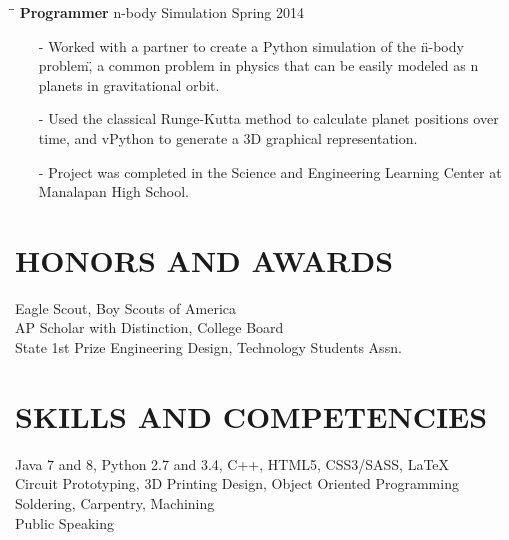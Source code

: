 \documentclass{res}
\begin{document}
\begin{resume}
\begin{tabbing}
    \hspace{2.3in}\= \hspace{2.4in}\= \kill
    {\bf Programmer} \>n-body Simulation \>Spring 2014\\
  \end{tabbing}\vspace{-15pt}
  \begin{itemize}[leftmargin=*, nolistsep]
    \item[-] Worked with a partner to create a Python simulation of the \"n-body problem\", a common problem in physics that can be easily modeled as n planets in gravitational orbit.
    \item[-] Used the classical Runge-Kutta method to calculate planet positions over time, and vPython to generate a 3D graphical representation.
    \item[-] Project was completed in the Science and Engineering Learning Center at Manalapan High School.
  \end{itemize}
 
\section{HONORS AND AWARDS}
	Eagle Scout, Boy Scouts of America \\
	AP Scholar with Distinction, College Board \\
	State 1st Prize Engineering Design, Technology Students Assn.

\section{SKILLS AND COMPETENCIES}
  Java 7 and 8, Python 2.7 and 3.4, C++, HTML5, CSS3/SASS, \LaTeX \\
  Circuit Prototyping, 3D Printing Design, Object Oriented Programming \\
  Soldering, Carpentry, Machining \\
  Public Speaking
	
\end{resume}
\end{document}
